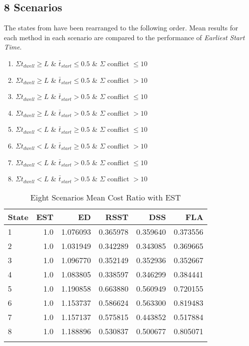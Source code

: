 \documentclass[conference]{IEEEtran}
\begin{document}
\subsection{8 Scenarios}

The states from \cite{modified_q_learn} have been rearranged to the following order.
Mean results for each method in each scenario are compared to the performance of \emph{Earliest Start Time}.

\begin{enumerate}
	\item $ \Sigma t_{dwell} \ge L $ \& $ \bar{t}_{start} \le 0.5 $ \& $ \Sigma $ conflict $ \le 10$
	\item $ \Sigma t_{dwell} \ge L $ \& $ \bar{t}_{start} \le 0.5 $ \& $ \Sigma $ conflict $ > 10$
	\item $ \Sigma t_{dwell} \ge L $ \& $ \bar{t}_{start} > 0.5 $ \& $ \Sigma $ conflict $ \le 10$
	\item $ \Sigma t_{dwell} \ge L $ \& $ \bar{t}_{start} > 0.5 $ \& $ \Sigma $ conflict $ > 10$
	\item $ \Sigma t_{dwell} < L $ \& $ \bar{t}_{start} \ge 0.5 $ \& $ \Sigma $ conflict $ \le 10$
	\item $ \Sigma t_{dwell} < L $ \& $ \bar{t}_{start} \ge 0.5 $ \& $ \Sigma $ conflict $ > 10$
	\item $ \Sigma t_{dwell} < L $ \& $ \bar{t}_{start} > 0.5 $ \& $ \Sigma $ conflict $ \le 10$
	\item $ \Sigma t_{dwell} < L $ \& $ \bar{t}_{start} > 0.5 $ \& $ \Sigma $ conflict $ > 10$
\end{enumerate}

\begin{table}[h]
	\begin{tabular}{lrrrrr}
		\hline
		\textbf{State} & \textbf{EST} & \textbf{ED} & \textbf{RSST} & \textbf{DSS} & \textbf{FLA} \\\hline
		1              & 1.0          & 1.076093    & 0.365978      & 0.359640     & 0.373556     \\
		2              & 1.0          & 1.031949    & 0.342289      & 0.343085     & 0.369665     \\
		3              & 1.0          & 1.096770    & 0.352149      & 0.352936     & 0.352667     \\
		4              & 1.0          & 1.083805    & 0.338597      & 0.346299     & 0.384441     \\
		5              & 1.0          & 1.190858    & 0.663880      & 0.560949     & 0.720155     \\
		6              & 1.0          & 1.153737    & 0.586624      & 0.563300     & 0.819483     \\
		7              & 1.0          & 1.157137    & 0.575815      & 0.443852     & 0.517884     \\
		8              & 1.0          & 1.188896    & 0.530837      & 0.500677     & 0.805071     \\ \hline
		\\
	\end{tabular}
	\caption{Eight Scenarios Mean Cost Ratio with EST}
	\label{tab:eight}
\end{table}
\end{document}
